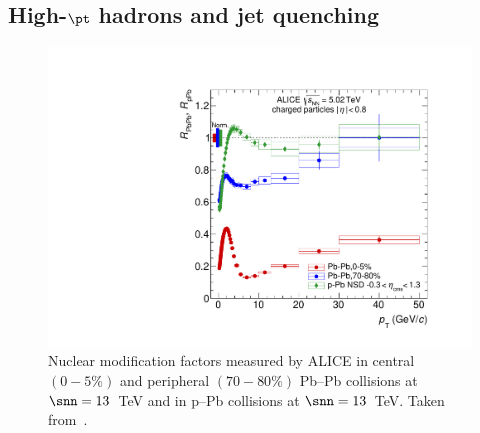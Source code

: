 \subsection{High-$\mathbf{\pt}$ hadrons and jet quenching}\label{sec:high_pt}
\begin{figure}[htb]
  \centering
  \includegraphics[width=0.7\linewidth]{Figures/Chapter 1/rAArpPb.pdf}
  \caption{Nuclear modification factors measured by ALICE in central $(0-5\%)$ and peripheral $(70-80\%)$ Pb--Pb collisions at $\snn=13$~TeV and in p--Pb collisions at $\snn = 13$~TeV. Taken from~\cite{ALICE:2018vuu}.}
  \label{fig:RAA}
\end{figure}

